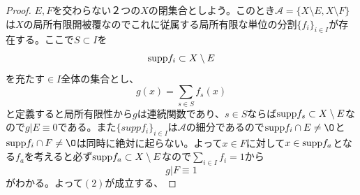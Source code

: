 \documentclass[leqno]{jsarticle}
\newcommand{\To}{\Longrightarrow}
\newcommand{\supp}{\text{{\rm supp}}}
\begin{document}
\begin{proof}
\par [$(5)\To(10)$の証明終わり]\par
[$(10)\To(2)$の証明]\par
$E,F$を交わらない２つの$X$の閉集合としよう。このとき$\mathcal{A}=\{X\setminus E,X\setminus F\}$は$X$の局所有限開被覆なのでこれに従属する局所有限な単位の分割$\{f_i\}_{i\in I}$が存在する。ここで$S\subset I$を
\[
\supp f_i\subset X\setminus E
\]
を充たす$\in I$全体の集合とし、
\[
g(x)=\sum_{s\in S}f_s(x)
\]
と定義すると局所有限性から$g$は連続関数であり、$s\in S$ならば$\supp f_s\subset X\setminus E$なので$g|E\equiv 0$である。また$\{supp f_i\}_{i\in I}$は$\mathcal{A}$の細分であるので$\supp f_i\cap E\neq\O$と$\supp f_{i}\cap F\neq\O$は同時に絶対に起らない。よって$x\in F$に対して$x\in \supp f_a$となる$f_a$を考えると必ず$\supp f_a\subset X\setminus E$なので$\sum_{i\in I} f_i=1$から
\[
g|F\equiv 1
\]
がわかる。よって$(2)$が成立する、
\par [$(10)\To(2)$の証明終わり]\par
\end{proof}
\end{document}
